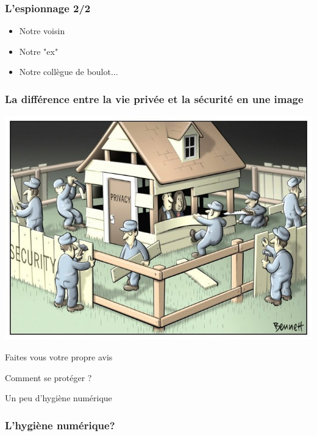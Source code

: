 \documentclass{beamer}
\begin{document}
\begin{frame}
\frametitle{L'espionnage 2/2}
\begin{itemize}
\item Notre voisin
\item Notre "ex"
\item Notre collègue de boulot...
\end{itemize}
\end{frame}

\begin{frame}
\frametitle{La différence entre la vie privée et la sécurité en une image}
\begin{center}
\includegraphics[scale=0.4]{./images/Security_Privacy.jpg}
\end{center}
\end{frame}

\begin{frame}
\Huge{\centerline{Faites vous votre propre avis}}
\end{frame}


\begin{frame}
\Huge{\centerline{Comment se protéger ?}}
\Huge{\centerline{Un peu d'hygiène numérique}}
\end{frame}

\begin{frame}
\frametitle{L'hygiène numérique?}
\begin{block}{}
\end{block}
\end{frame}
\end{document}
